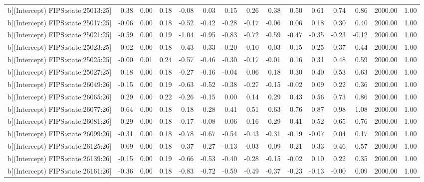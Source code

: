 \begin{table}[ht]
\begin{tabular}{rrrrrrrrrrrrrrr}
  b[(Intercept) FIPS:state:25013:25] & 0.38 & 0.00 & 0.18 & -0.08 & 0.03 & 0.15 & 0.26 & 0.38 & 0.50 & 0.61 & 0.74 & 0.86 & 2000.00 & 1.00 \\ 
  b[(Intercept) FIPS:state:25017:25] & -0.06 & 0.00 & 0.18 & -0.52 & -0.42 & -0.28 & -0.17 & -0.06 & 0.06 & 0.18 & 0.30 & 0.40 & 2000.00 & 1.00 \\ 
  b[(Intercept) FIPS:state:25021:25] & -0.59 & 0.00 & 0.19 & -1.04 & -0.95 & -0.83 & -0.72 & -0.59 & -0.47 & -0.35 & -0.23 & -0.12 & 2000.00 & 1.00 \\ 
  b[(Intercept) FIPS:state:25023:25] & 0.02 & 0.00 & 0.18 & -0.43 & -0.33 & -0.20 & -0.10 & 0.03 & 0.15 & 0.25 & 0.37 & 0.44 & 2000.00 & 1.00 \\ 
  b[(Intercept) FIPS:state:25025:25] & -0.00 & 0.01 & 0.24 & -0.57 & -0.46 & -0.30 & -0.17 & -0.01 & 0.16 & 0.31 & 0.48 & 0.59 & 2000.00 & 1.00 \\ 
  b[(Intercept) FIPS:state:25027:25] & 0.18 & 0.00 & 0.18 & -0.27 & -0.16 & -0.04 & 0.06 & 0.18 & 0.30 & 0.40 & 0.53 & 0.63 & 2000.00 & 1.00 \\ 
  b[(Intercept) FIPS:state:26049:26] & -0.15 & 0.00 & 0.19 & -0.63 & -0.52 & -0.38 & -0.27 & -0.15 & -0.02 & 0.09 & 0.22 & 0.36 & 2000.00 & 1.00 \\ 
  b[(Intercept) FIPS:state:26065:26] & 0.29 & 0.00 & 0.22 & -0.26 & -0.15 & 0.00 & 0.14 & 0.29 & 0.43 & 0.56 & 0.73 & 0.86 & 2000.00 & 1.00 \\ 
  b[(Intercept) FIPS:state:26077:26] & 0.64 & 0.00 & 0.18 & 0.18 & 0.28 & 0.41 & 0.51 & 0.63 & 0.76 & 0.87 & 0.98 & 1.08 & 2000.00 & 1.00 \\ 
  b[(Intercept) FIPS:state:26081:26] & 0.29 & 0.00 & 0.18 & -0.17 & -0.08 & 0.06 & 0.16 & 0.29 & 0.41 & 0.52 & 0.65 & 0.76 & 2000.00 & 1.00 \\ 
  b[(Intercept) FIPS:state:26099:26] & -0.31 & 0.00 & 0.18 & -0.78 & -0.67 & -0.54 & -0.43 & -0.31 & -0.19 & -0.07 & 0.04 & 0.17 & 2000.00 & 1.00 \\ 
  b[(Intercept) FIPS:state:26125:26] & 0.09 & 0.00 & 0.18 & -0.37 & -0.27 & -0.13 & -0.03 & 0.09 & 0.21 & 0.33 & 0.46 & 0.57 & 2000.00 & 1.00 \\ 
  b[(Intercept) FIPS:state:26139:26] & -0.15 & 0.00 & 0.19 & -0.66 & -0.53 & -0.40 & -0.28 & -0.15 & -0.02 & 0.10 & 0.22 & 0.35 & 2000.00 & 1.00 \\ 
  b[(Intercept) FIPS:state:26161:26] & -0.36 & 0.00 & 0.18 & -0.83 & -0.72 & -0.59 & -0.49 & -0.37 & -0.23 & -0.13 & -0.00 & 0.09 & 2000.00 & 1.00 \\ 

\end{tabular}
\end{table}
